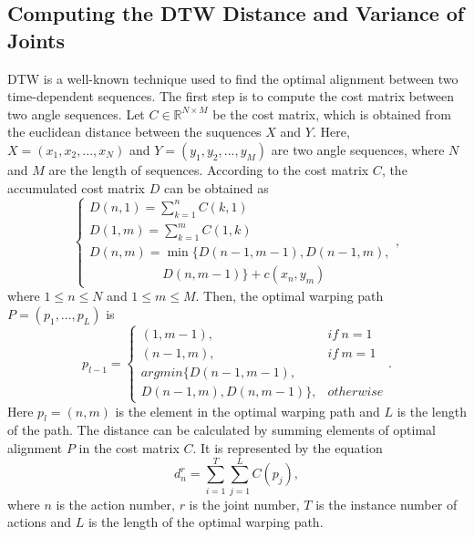 \documentclass[conference]{IEEEtran}
\begin{document}
	\subsection{Computing the DTW Distance and Variance of Joints}
	\label{sec:dtw and variance}
		DTW is a well-known technique used to find the optimal alignment between two time-dependent sequences.
		The first step is to compute the cost matrix between two angle sequences.
		Let $ C\in\mathbb{R}^{N\times M} $ be the cost matrix, which is obtained from the euclidean distance between the suquences $ X $ and $ Y $.
		Here, $ X=(x_{1},x_{2},...,x_{N}) $ and $ Y=(y_{1},y_{2},...,y_{M}) $ are two angle sequences, where $ N $ and $ M $ are the length of sequences.
		According to the cost matrix $ C $, the accumulated cost matrix $ D $ can be obtained as
		\begin{equation}
			\left\{
			\begin{array}{l}
			D(n,1)=\sum_{k=1}^{n}C(k,1) \\
			D(1,m)=\sum_{k=1}^{m}C(1,k) \\
			D(n,m)=\min\{D(n-1,m-1),D(n-1,m), \\
			~~~~~~~~~~~~~~~~~~~~~~~~~~D(n,m-1)\}+c(x_{n},y_{m})
			\end{array}
			\right.,
		\end{equation}
		where $ 1\leq n\leq N $ and $ 1\leq m\leq M $.
		Then, the optimal warping path $ P=(p_{1},...,p_{L}) $ is
		\begin{equation}
			p_{l-1}=\left\{
			\begin{array}{ll}
			(1,m-1),& if~n=1 \\
			(n-1,m),& if~m=1 \\
			argmin\{D(n-1,m-1), & \\
			D(n-1,m),D(n,m-1)\},& otherwise
			\end{array}
			\right..
		\end{equation}
		Here $ p_{l} = (n, m) $ is the element in the optimal warping path and $ L $ is the length of the path.
		The distance can be calculated by summing elements of optimal alignment $ P $ in the cost matrix $ C $.
		It is represented by the equation
		\begin{equation}
			d_{n}^{r}=\sum_{i=1}^{T}\sum_{j=1}^{L}C(p_{j}),
		\end{equation}
		where $ n $ is the action number, $ r $ is the joint number, $ T $ is the instance number of actions and $ L $ is the length of the optimal warping path.
\end{document}

